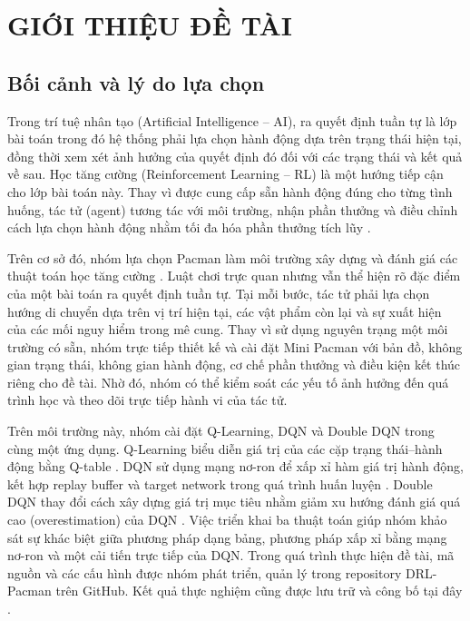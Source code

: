 \section{GIỚI THIỆU ĐỀ TÀI}

\subsection{Bối cảnh và lý do lựa chọn}

Trong trí tuệ nhân tạo (Artificial Intelligence -- AI), ra quyết định tuần tự là lớp bài toán trong đó hệ thống phải lựa chọn hành động dựa trên trạng thái hiện tại, đồng thời xem xét ảnh hưởng của quyết định đó đối với các trạng thái và kết quả về sau. Học tăng cường (Reinforcement Learning -- RL) là một hướng tiếp cận cho lớp bài toán này. Thay vì được cung cấp sẵn hành động đúng cho từng tình huống, tác tử (agent) tương tác với môi trường, nhận phần thưởng và điều chỉnh cách lựa chọn hành động nhằm tối đa hóa phần thưởng tích lũy \cite{SuttonBarto2018}.

Trên cơ sở đó, nhóm lựa chọn Pacman làm môi trường xây dựng và đánh giá các thuật toán học tăng cường \cite{BerkeleyPacman2024}. Luật chơi trực quan nhưng vẫn thể hiện rõ đặc điểm của một bài toán ra quyết định tuần tự. Tại mỗi bước, tác tử phải lựa chọn hướng di chuyển dựa trên vị trí hiện tại, các vật phẩm còn lại và sự xuất hiện của các mối nguy hiểm trong mê cung. Thay vì sử dụng nguyên trạng một môi trường có sẵn, nhóm trực tiếp thiết kế và cài đặt Mini Pacman với bản đồ, không gian trạng thái, không gian hành động, cơ chế phần thưởng và điều kiện kết thúc riêng cho đề tài. Nhờ đó, nhóm có thể kiểm soát các yếu tố ảnh hưởng đến quá trình học và theo dõi trực tiếp hành vi của tác tử.

Trên môi trường này, nhóm cài đặt Q-Learning, DQN và Double DQN trong cùng một ứng dụng. Q-Learning biểu diễn giá trị của các cặp trạng thái--hành động bằng Q-table \cite{WatkinsDayan1992}. DQN sử dụng mạng nơ-ron để xấp xỉ hàm giá trị hành động, kết hợp replay buffer và target network trong quá trình huấn luyện \cite{Mnih2013,Mnih2015}. Double DQN thay đổi cách xây dựng giá trị mục tiêu nhằm giảm xu hướng đánh giá quá cao (overestimation) của DQN \cite{VanHasselt2016}. Việc triển khai ba thuật toán giúp nhóm khảo sát sự khác biệt giữa phương pháp dạng bảng, phương pháp xấp xỉ bằng mạng nơ-ron và một cải tiến trực tiếp của DQN. Trong quá trình thực hiện đề tài, mã nguồn và các cấu hình được nhóm phát triển, quản lý trong repository DRL-Pacman trên GitHub. Kết quả thực nghiệm cũng được lưu trữ và công bố tại đây \cite{DRLPacmanGitHub}.

